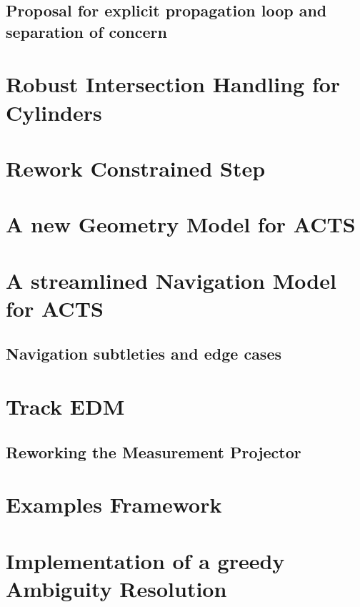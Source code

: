 \subsection{Proposal for explicit propagation loop and separation of concern}

\section{Robust Intersection Handling for Cylinders}

\section{Rework Constrained Step}

\section{A new Geometry Model for ACTS}

\section{A streamlined Navigation Model for ACTS}

\subsection{Navigation subtleties and edge cases}

\section{Track EDM}

\subsection{Reworking the Measurement Projector}

\section{Examples Framework}


\section{Implementation of a greedy Ambiguity Resolution}


